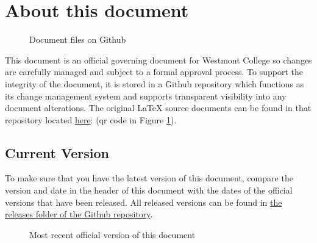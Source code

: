 \documentclass[letterpaper, 11pt]{article}
\begin{document}
		\newpage
\section{About this document}
	\begin{figure}
		\centering
		\vspace{-30pt}
		\caption[Docment files on Github]{Document files on Github}
		\label{fig:qr_repo}
	\end{figure}

	This document is an official governing document for Westmont College so changes are carefully managed and subject to a formal approval process.
	To support the integrity of the document, it is stored in a Github repository which functions as its change management system and supports transparent visibility into any document alterations.
	The original LaTeX source documents can be found in that repository located \href{https://github.com/djp3/WestmontFacultyHandbook}{here}:	(qr code in Figure \ref{fig:qr_repo}).

	\subsection{Current Version}

		To make sure that you have the latest version of this document, compare the version and date in the
		header of this document with the dates of the official versions that have been released.
		All released versions can be found in
		\href{https://github.com/djp3/WestmontFacultyHandbook/tree/main/releases}{the releases folder of the Github repository}.

		\begin{figure}
			\centering
			\vspace{-30pt}
			\caption[placeholder]{Most recent official version of this document}
			\label{fig:qr_current}
		\end{figure}
\end{document}
